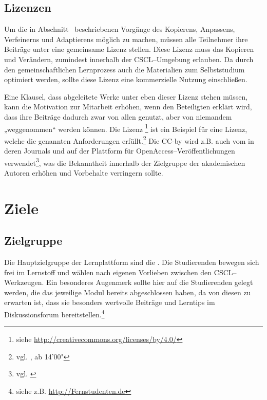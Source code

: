 \subsection{Lizenzen} %
\label{sub:lizenzen}
Um die in Abschnitt~ beschriebenen Vorgänge des Kopierens, Anpassens, Verfeinerns und Adaptierens möglich zu machen, müssen alle Teilnehmer ihre Beiträge unter eine gemeinsame Lizenz stellen. Diese Lizenz muss das Kopieren und Verändern, zumindest innerhalb der \ac{CSCL}–Umgebung erlauben. Da durch den gemeinschaftlichen Lernprozess auch die Materialien zum Selbststudium optimiert werden, sollte diese Lizenz eine kommerzielle Nutzung einschließen. 

Eine Klausel, dass abgeleitete Werke unter eben dieser Lizenz stehen müssen, kann die Motivation zur Mitarbeit erhöhen, wenn den Beteiligten erklärt wird, dass ihre Beiträge dadurch zwar von allen genutzt, aber von niemandem „weggenommen“ werden können. Die Lizenz \footnote{siehe \url{http://creativecommons.org/licenses/by/4.0/}} ist ein Beispiel für eine Lizenz, welche die genannten Anforderungen erfüllt.\footnote{vgl. \cite{baraniuk}, ab 14'00"} Die \ac{CC-by} wird z.B. auch vom  in deren Journals und auf der Plattform  für OpenAccess–Veröffentlichungen verwendet\footnote{vgl. \cite{springercc}}, was die Bekanntheit innerhalb der Zielgruppe der akademischen Autoren erhöhen und Vorbehalte verringern sollte.



\section{Ziele} %
\label{sec:ziele}

\subsection{Zielgruppe} %
\label{sub:zielgruppe}
Die Hauptzielgruppe der Lernplattform sind die . Die Studierenden bewegen sich frei im Lernstoff und wählen nach eigenen Vorlieben zwischen den CSCL–Werkzeugen. Ein besonderes Augenmerk sollte hier auf die Studierenden gelegt werden, die das jeweilige Modul bereits abgeschlossen haben, da von diesen zu erwarten ist, dass sie besonders wertvolle Beiträge und Lerntips im Diskussionsforum bereitstellen.\footnote{siehe z.B. \url{http://Fernstudenten.de}}

